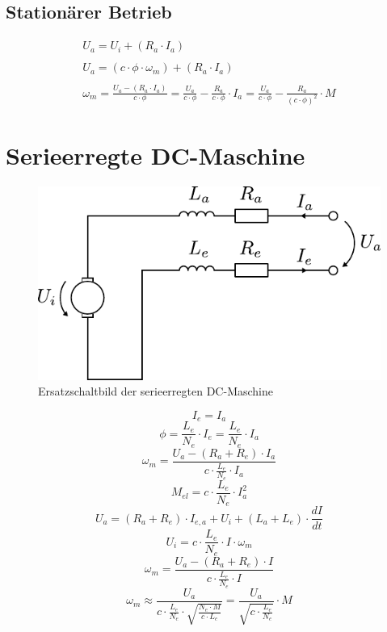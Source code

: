 \subsection{Stationärer Betrieb}
\[ \begin{array}{l}
U_a = U_i + (R_a \cdot I_a) \\\\
U_a = (c \cdot \phi \cdot \omega_m) + (R_a \cdot I_a) \\\\
\omega_m 
	= \frac{U_a - (R_a \cdot I_a)}{c \cdot \phi}
	= \frac{U_a}{c \cdot \phi} - \frac{R_a}{c \cdot \phi} \cdot I_a
	= \frac{U_a}{c \cdot \phi} - \frac{R_a}{(c \cdot \phi)^2} \cdot M
\end{array} \]

\newpage

\section{Serieerregte DC-Maschine}\label{sec:dc-motor-serie}

\begin{figure}[h!]
\centering
\includegraphics[scale=\schscale]{../fig/dc-motor-serie.pdf}
\caption{Ersatzschaltbild der serieerregten DC-Maschine}
\label{sch:dc-maschine-serie}
\end{figure}

\[ I_e = I_a \]
\[ \phi = \frac{L_e}{N_e} \cdot I_e = \frac{L_e}{N_e} \cdot I_a \]
\[ \omega_m = \frac{U_a - (R_a + R_e) \cdot I_a}{c \cdot \frac{L_e}{N_e} \cdot I_a} \]
\[ M_{el} = c \cdot \frac{L_e}{N_e} \cdot I_a^2 \]
\[ U_a = (R_a + R_e) \cdot I_{e,a} + U_i + (L_a + L_e) \cdot \frac{d I}{d t} \]
\[ U_i = c \cdot \frac{L_e}{N_e} \cdot I \cdot \omega_m \]
\[ \omega_m = \frac{U_a - (R_a + R_e) \cdot I}{c \cdot \frac{L_e}{N_e} \cdot I} \]
\[ \omega_m \approx \frac{U_a}{c \cdot \frac{L_e}{N_e} \cdot \sqrt{\frac{N_e \cdot M}{c \cdot L_e}}} 
	= \frac{U_a}{\sqrt{c \cdot \frac{L_e}{N_e}}} \cdot M \]

